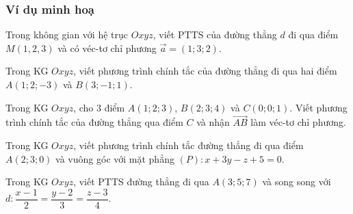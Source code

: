 	\subsubsection{Ví dụ minh hoạ}
	\begin{vd}%
	Trong không gian với hệ trục $Oxyz$, viết PTTS của đường thẳng $d$ đi qua điểm $M(1,2,3)$ và có véc-tơ chỉ phương $\vec{a}=(1;3;2)$.
	\end{vd}
	\begin{vd}%
	Trong KG $Oxyz$, viết phương trình chính tắc của đường thẳng đi qua hai điểm $A(1;2;-3)$ và $B(3;-1;1)$.
	\end{vd}
	\begin{vd}%
	Trong KG $Oxyz$, cho $3$ điểm $A(1;2;3)$, $B(2;3;4)$ và $C(0;0;1)$. Viết phương trình chính tắc của đường thẳng qua điểm $C$ và nhận $\overrightarrow{AB}$ làm véc-tơ chỉ phương.
	\end{vd}
	\begin{vd}%
	Trong KG $Oxyz$, viết phương trình chính tắc đường thẳng đi qua điểm $A(2;3;0)$ và vuông góc với mặt phẳng $(P): x + 3y - z + 5 = 0.$
	\end{vd}
	\begin{vd}%
	Trong KG $Oxyz$, viết PTTS đường thẳng đi qua $A\left(3;5;7\right)$ và song song với $d:\dfrac{x-1}{2}=\dfrac{y-2}{3}=\dfrac{z-3}{4}$.
	\end{vd}

